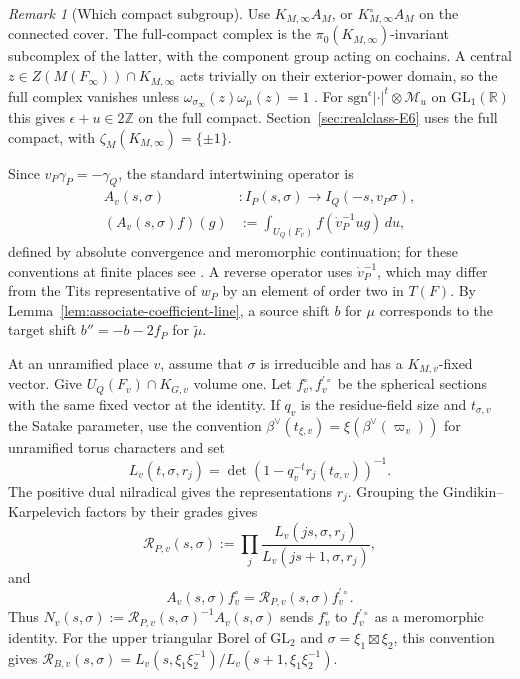 \documentclass[12pt]{amsart}
\numberwithin{equation}{section}
\theoremstyle{plain}
\theoremstyle{definition}
\theoremstyle{remark}
\newtheorem{remark}[theorem]{Remark}
\newcommand{\R}{\mathbb R}
\newcommand{\GL}{\mathrm{GL}}
\newcommand{\Z}{\mathbb{Z}}
\newcommand{\cM}{\mathcal M}
\newcommand{\sgn}{\mathrm{sgn}}
\begin{document}
\begin{remark}[Which compact subgroup]\label{rem:compact-conventions}
Use $K_{M,\infty}A_M$, or $K_{M,\infty}^{\circ}A_M$ on the connected cover. The full-compact complex is the $\pi_0(K_{M,\infty})$-invariant subcomplex of the latter, with the component group acting on cochains. A central $z\in Z(M(F_\infty))\cap K_{M,\infty}$ acts trivially on their exterior-power domain, so the full complex vanishes unless $\omega_{\sigma_\infty}(z)\omega_\mu(z)=1$ \cite[Ch.~I, \S5.1]{BorelWallach}. For $\sgn^\epsilon|\cdot|^t\otimes\cM_u$ on $\GL_1(\R)$ this gives $\epsilon+u\in2\Z$ on the full compact. Section~\ref{sec:realclass-E6} uses the full compact, with $\zeta_M(K_{M,\infty})=\{\pm1\}$.

\end{remark}

Since $v_P\gamma_P=-\gamma_Q$, the standard intertwining operator is 
\begin{equation}\label{eq:standard-intertwiner}
 \begin{aligned}
 A_v(s,\sigma)&:I_P(s,\sigma)\longrightarrow I_Q(-s,v_P\sigma),\\
 (A_v(s,\sigma)f)(g)
   &:=\int_{U_Q(F_v)}f(\dot v_P^{-1}ug)\,du,
 \end{aligned}
\end{equation}
defined by absolute convergence and meromorphic continuation; for these conventions at finite places see \cite[\S2.2]{RaghuramPadic2023}. A reverse operator uses $\dot v_P^{-1}$, which may differ from the Tits representative of $w_P$ by an element of order two in $T(F)$. By Lemma~\ref{lem:associate-coefficient-line}, a source shift $b$ for $\mu$ corresponds to the target shift $b''=-b-2f_P$ for $\widetilde\mu$.

At an unramified place $v$, assume that $\sigma$ is irreducible and has a $K_{M,v}$-fixed vector. Give $U_Q(F_v)\cap K_{G,v}$ volume one. Let $f_v^\circ,f_v^{\prime\circ}$ be the spherical sections with the same fixed vector at the identity. If $q_v$ is the residue-field size and $t_{\sigma,v}$ the Satake parameter, use the convention $\beta^\vee(t_{\xi,v})=\xi(\beta^\vee(\varpi_v))$ for unramified torus characters and set
\[
 L_v(t,\sigma,r_j)=\det(1-q_v^{-t}r_j(t_{\sigma,v}))^{-1}.
\]
The positive dual nilradical gives the representations $r_j$. Grouping the Gindikin--Karpelevich factors by their grades \cite[Ch.~4]{Langlands1971} gives
\begin{equation}\label{eq:adjacent-tuple}
 \mathcal R_{P,v}(s,\sigma)
   :=\prod_j\frac{L_v(js,\sigma,r_j)}{L_v(js+1,\sigma,r_j)},
\end{equation}
and
\begin{equation}\label{eq:gindikin-karpelevich}
 A_v(s,\sigma)f_v^\circ
   =\mathcal R_{P,v}(s,\sigma)f_v^{\prime\circ}.
\end{equation}
Thus $N_v(s,\sigma):=\mathcal R_{P,v}(s,\sigma)^{-1}A_v(s,\sigma)$ sends $f_v^\circ$ to $f_v^{\prime\circ}$ as a meromorphic identity. For the upper triangular Borel of $\mathrm{GL}_2$ and $\sigma=\xi_1\boxtimes\xi_2$, this convention gives $\mathcal R_{B,v}(s,\sigma)
=L_v(s,\xi_1\xi_2^{-1})/L_v(s+1,\xi_1\xi_2^{-1})$.
\end{document}
